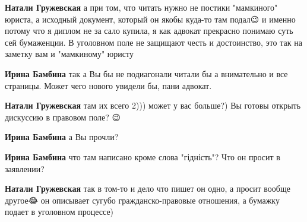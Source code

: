 \begin{itemize}
\begin{itemize}
\textbf{Натали Гружевская} а при том, что читать нужно не постики "мамкиного" юриста, а исходный документ, который он якобы куда-то там подал😉 и именно потому что я диплом не за сало купила, я как адвокат прекрасно понимаю суть сей бумаженции. В уголовном поле не защищают честь и достоинство, это так на заметку вам и "мамкиному" юристу

 
\textbf{Ирина Бамбина} так а Вы бы не подиагонали читали бы а внимательно и все страницы. Может чего нового увидели бы, пани адвокат.🤭

 
\textbf{Натали Гружевская} там их всего 2))) может у вас больше?) Вы готовы открыть дискуссию в правовом поле? 😉

 
\textbf{Ирина Бамбина} а Вы прочли?

 
\textbf{Ирина Бамбина} что там написано кроме слова "гідність"? Что он просит в заявлении?

 
\textbf{Натали Гружевская} так в том-то и дело что пишет он одно, а просит вообще другое😂 он описывает сугубо гражданско-правовые отношения, а бумажку подает в уголовном процессе)


\end{itemize}
\end{itemize}

